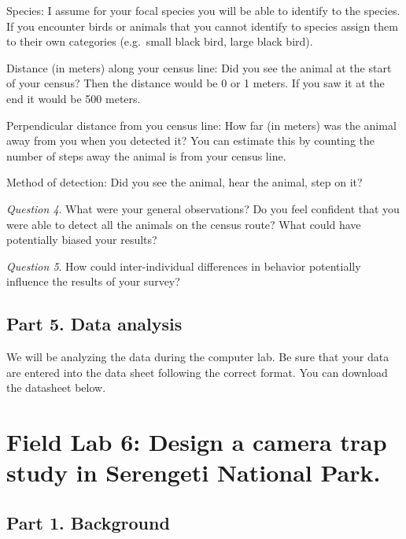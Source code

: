 \documentclass[]{book}
\begin{document}
Species: I assume for your focal species you will be able to identify to the species. If you encounter birds or animals that you cannot identify to species assign them to their own categories (e.g.~small black bird, large black bird).

Distance (in meters) along your census line: Did you see the animal at the start of your census? Then the distance would be 0 or 1 meters. If you saw it at the end it would be 500 meters.

Perpendicular distance from you census line: How far (in meters) was the animal away from you when you detected it? You can estimate this by counting the number of steps away the animal is from your census line.

Method of detection: Did you see the animal, hear the animal, step on it?

\emph{Question 4}. What were your general observations? Do you feel confident that you were able to detect all the animals on the census route? What could have potentially biased your results?

\emph{Question 5}. How could inter-individual differences in behavior potentially influence the results of your survey?

\hypertarget{part-5.-data-analysis}{%
\section*{Part 5. Data analysis}\label{part-5.-data-analysis}}

We will be analyzing the data during the computer lab. Be sure that your data are entered into the data sheet following the correct format. You can download the datasheet below.

\hypertarget{field-lab-6-design-a-camera-trap-study-in-serengeti-national-park.}{%
\chapter*{Field Lab 6: Design a camera trap study in Serengeti National Park.}\label{field-lab-6-design-a-camera-trap-study-in-serengeti-national-park.}}

\hypertarget{part-1.-background-1}{%
\section*{Part 1. Background}\label{part-1.-background-1}}
\end{document}
